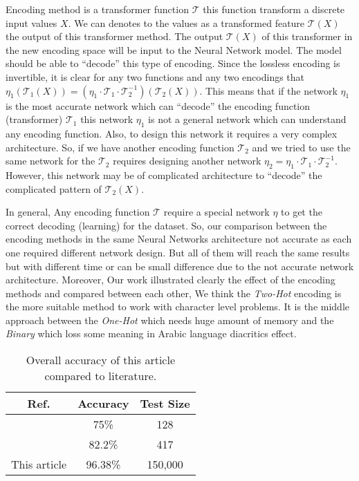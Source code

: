 Encoding method is a transformer function $\mathcal{T}$ this function transform a discrete input values $X$. We can denotes to the values as a transformed feature $\mathcal{T}(X)$ the output of this transformer method. The output $\mathcal{T}(X)$ of this transformer in the new encoding space will be input to the Neural Network model. The model should be able to ``decode''  this type of encoding. Since the lossless encoding is invertible, it is clear for any two functions and any two encodings that $\eta_1\left(\mathcal{T}_1(X)\right) = \left(\eta_1\cdot\mathcal{T}_1\cdot \mathcal{T}_2^{-1} \right)\left(\mathcal{T}_2(X)\right)$. This means that if the network $\eta_1$ is the most accurate network which can ``decode'' the encoding function (transformer) $\mathcal{T}_1$ this network $\eta_1$ is not a general network which can understand any encoding function. Also, to design this network it requires a very complex architecture. So, if we have another encoding function $\mathcal{T}_2$ and we tried to use the same network for the $\mathcal{T}_2$ requires designing another network $\eta_2 = \eta_1\cdot\mathcal{T}_1\cdot \mathcal{T}_2^{-1}$. However, this network may be of complicated architecture to ``decode'' the complicated pattern of $\mathcal{T}_2(X)$.

In general, Any encoding function $\mathcal{T}$ require a special network $\eta$ to get the correct decoding (learning) for the dataset. So, our comparison between the encoding methods in the same Neural Networks architecture not accurate as each one required different network design. But all of them will reach the same results but with different time or can be small difference due to the not accurate network architecture. Moreover, Our work illustrated clearly the effect of the encoding methods and compared between each other, We think the \textit{Two-Hot} encoding is the more suitable method to work with character level problems. It is the middle approach between the \textit{One-Hot} which needs huge amount of memory and the \textit{Binary} which loss some meaning in Arabic language diacritics effect.


\begin{table}[!t]
  \centering
  \begin{tabular}{c c c}
    \toprule
    \textbf{Ref.}& \textbf{Accuracy}& \textbf{Test Size} \\
    \midrule
    \cite{Alnagdawi2013FindingArabicPoemMeter}   & 75\%     & 128\\
    \cite{Abuata2016RuleBasedAlgorithmFor}      & 82.2\%   & 417  \\
    This article   & 96.38\%  & 150,000 \\
    \bottomrule
  \end{tabular}
  \caption{Overall accuracy of this article compared to literature.}\label{tab:Summary_Results}
\end{table}



